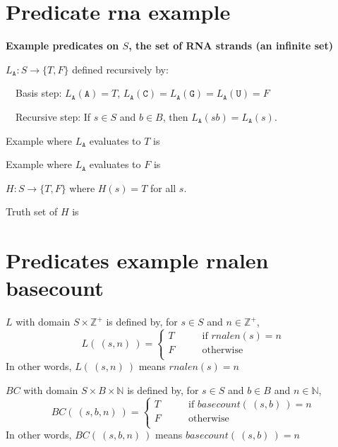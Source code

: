 \documentclass[12pt, oneside]{article}
\newcommand{\A}[0]{\texttt{A}}
\newcommand{\C}[0]{\texttt{C}}
\newcommand{\G}[0]{\texttt{G}}
\newcommand{\U}[0]{\texttt{U}}
\begin{document}
\begin{flushright}
\end{flushright} \section*{Predicate rna example}


{\bf Example predicates on $S$, the set of RNA strands (an infinite set)}


$L_{\A}: S \to \{T, F\}$  defined recursively by: 

~~Basis step: $L_{\A}(\A) = T$, $L_{\A}(\C) = L_{\A}(\G) = L_{\A}(\U) = F$

~~Recursive step: If $s \in S$ and $b \in B$, then $L_{\A}(sb) = L_{\A}(s)$.

Example where $L_{\A}$ evaluates to $T$ is \underline{\phantom{$\A\C\G$~\hspace{1in}}}

\vfill

Example where $L_{\A}$ evaluates to $F$ is \underline{\phantom{$\U\A\C\U$\hspace{1in}}}

\vfill


$H: S \to \{T, F\}$ where $H(s) = T$ for all $s$.

Truth set of $H$ is \underline{}

\vfill
 \vfill
\section*{Predicates example rnalen basecount}




$L$ with domain $S \times \mathbb{Z}^+$ is defined by, for $s \in S$ and $n \in \mathbb{Z}^+$,
\[
L( ~(s, n)~) = \begin{cases}
T &\qquad\text{if $rnalen(s) = n$}\\
F &\qquad\text{otherwise}\\
\end{cases}
\]
In other words, $L(~(s,n)~)$ means $rnalen(s) = n$


\vfill

$BC$ with domain $S \times B \times \mathbb{N}$ is defined by, 
for $s \in S$ and $b \in B$ and $n \in \mathbb{N}$,
\[
BC(~(s, b, n)~) = \begin{cases}
T &\qquad\text{if $basecount(~(s,b)~) = n$}\\
F &\qquad\text{otherwise}\\
\end{cases}
\]
In other words, $BC(~(s,b,n)~)$ means $basecount(~(s,b)~) = n$
\end{document}
